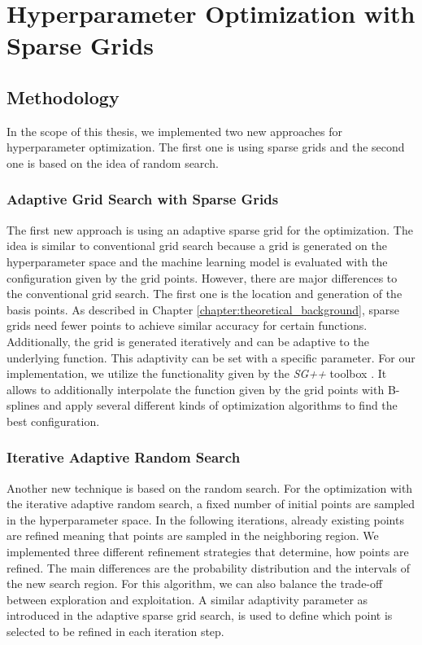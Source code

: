 
\chapter{Hyperparameter Optimization with Sparse Grids}\label{chapter:main_part}

\section{Methodology}

In the scope of this thesis, we implemented two new approaches for hyperparameter optimization. The first one is using sparse grids and the second one is based on the idea of random search. 

\subsection{Adaptive Grid Search with Sparse Grids}

The first new approach is using an adaptive sparse grid for the optimization. The idea is similar to conventional grid search because a grid is generated on the hyperparameter space and the machine learning model is evaluated with the configuration given by the grid points. However, there are major differences to the conventional grid search. The first one is the location and generation of the basis points. As described in Chapter \ref{chapter:theoretical_background}, sparse grids need fewer points to achieve similar accuracy for certain functions. Additionally, the grid is generated iteratively and can be adaptive to the underlying function. This adaptivity can be set with a specific parameter. For our implementation, we utilize the functionality given by the \textit{SG++} toolbox \cite{valentin2016hierarchical}. It allows to additionally interpolate the function given by the grid points with B-splines and apply several different kinds of optimization algorithms to find the best configuration.


\subsection{Iterative Adaptive Random Search}

Another new technique is based on the random search. For the optimization with the iterative adaptive random search, a fixed number of initial points are sampled in the hyperparameter space. In the following iterations, already existing points are refined meaning that points are sampled in the neighboring region. We implemented three different refinement strategies that determine, how points are refined. The main differences are the probability distribution and the intervals of the new search region. For this algorithm, we can also balance the trade-off between exploration and exploitation. A similar adaptivity parameter as introduced in the adaptive sparse grid search, is used to define which point is selected to be refined in each iteration step.

